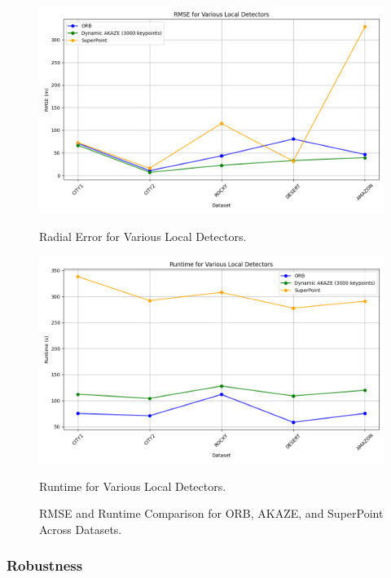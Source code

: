 \begin{figure}[H]
    \centering
    \begin{minipage}{0.45\textwidth}
        \centering
        \includegraphics[width=\textwidth]{./Chapter 4/testresults/rmse_detectors.png}
        \caption{Radial Error for Various Local Detectors.}
        \label{fig:rmse_detectors}
    \end{minipage}\hfill
    \begin{minipage}{0.45\textwidth}
        \centering
        \includegraphics[width=\textwidth]{./Chapter 4/testresults/runtime_detectors.png}
        \caption{Runtime for Various Local Detectors.}
        \label{fig:runtime_detectors}
    \end{minipage}
    \caption{RMSE and Runtime Comparison for ORB, AKAZE, and SuperPoint Across Datasets.}
    \label{fig:rmse_runtime_detectors}
\end{figure}


\subsubsection{Robustness}

